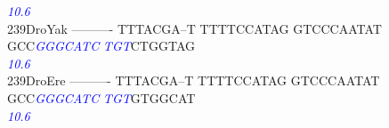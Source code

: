 \documentclass[11pt,twoside,reqno,a4paper]{article}
\begin{document}
{\hspace*{4\charwidth}\hspace*{7\charwidth}\hspace*{1\charwidth}\hspace*{1\charwidth}\hspace*{1\charwidth}\hspace*{1\charwidth}\hspace*{43\charwidth}\textit{\textcolor{Blue}{10.6}}\hspace*{1\charwidth}\hspace*{1\charwidth}\\
239\hspace*{1\charwidth}DroYak	----------	TTTACGA--T	TTTTCCATAG	GTCCCAATAT	GCC\textit{\textcolor{Blue}{G}}\textit{\textcolor{Blue}{G}}\textit{\textcolor{Blue}{G}}\textit{\textcolor{Blue}{C}}\textit{\textcolor{Blue}{A}}\textit{\textcolor{Blue}{T}}\textit{\textcolor{Blue}{C}}	\textit{\textcolor{Blue}{T}}\textit{\textcolor{Blue}{G}}\textit{\textcolor{Blue}{T}}CTGGTAG	\\
\hspace*{4\charwidth}\hspace*{7\charwidth}\hspace*{1\charwidth}\hspace*{1\charwidth}\hspace*{1\charwidth}\hspace*{1\charwidth}\hspace*{43\charwidth}\textit{\textcolor{Blue}{10.6}}\hspace*{1\charwidth}\hspace*{1\charwidth}\\
239\hspace*{1\charwidth}DroEre	----------	TTTACGA--T	TTTTCCATAG	GTCCCAATAT	GCC\textit{\textcolor{Blue}{G}}\textit{\textcolor{Blue}{G}}\textit{\textcolor{Blue}{G}}\textit{\textcolor{Blue}{C}}\textit{\textcolor{Blue}{A}}\textit{\textcolor{Blue}{T}}\textit{\textcolor{Blue}{C}}	\textit{\textcolor{Blue}{T}}\textit{\textcolor{Blue}{G}}\textit{\textcolor{Blue}{T}}GTGGCAT	\\
\hspace*{4\charwidth}\hspace*{7\charwidth}\hspace*{1\charwidth}\hspace*{1\charwidth}\hspace*{1\charwidth}\hspace*{1\charwidth}\hspace*{43\charwidth}\textit{\textcolor{Blue}{10.6}}\hspace*{1\charwidth}\hspace*{1\charwidth}\\
}
\end{document}
